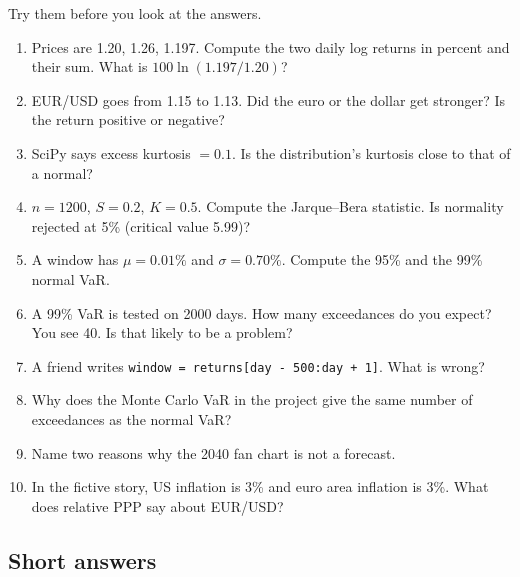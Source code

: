 \documentclass[11pt,a4paper]{article}
\newcommand{\code}[1]{\texttt{#1}}
\begin{document}
Try them before you look at the answers.

\begin{enumerate}[label=\textbf{\arabic*.}]
  \item Prices are 1.20, 1.26, 1.197. Compute the two daily log returns in
    percent and their sum. What is $100\ln(1.197/1.20)$?
  \item EUR/USD goes from 1.15 to 1.13. Did the euro or the dollar get
    stronger? Is the return positive or negative?
  \item SciPy says excess kurtosis $= 0.1$. Is the distribution's kurtosis
    close to that of a normal?
  \item $n=1200$, $S=0.2$, $K=0.5$. Compute the Jarque--Bera statistic. Is
    normality rejected at 5\% (critical value 5.99)?
  \item A window has $\mu = 0.01\%$ and $\sigma = 0.70\%$. Compute the 95\%
    and the 99\% normal VaR.
  \item A 99\% VaR is tested on 2000 days. How many exceedances do you
    expect? You see 40. Is that likely to be a problem?
  \item A friend writes \code{window = returns[day - 500:day + 1]}. What is
    wrong?
  \item Why does the Monte Carlo VaR in the project give the same number of
    exceedances as the normal VaR?
  \item Name two reasons why the 2040 fan chart is not a forecast.
  \item In the fictive story, US inflation is 3\% and euro area inflation is
    3\%. What does relative PPP say about EUR/USD?
\end{enumerate}

\subsection*{Short answers}
\end{document}
